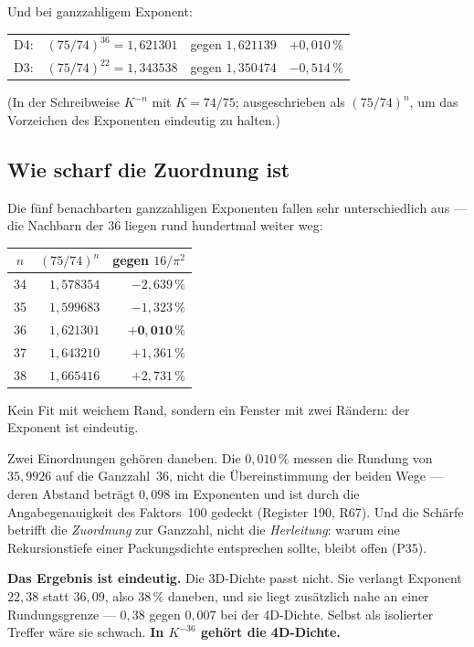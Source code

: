 Und bei ganzzahligem Exponent:
\begin{center}
\begin{tabular}{lllr}
D4: & $(75/74)^{36} = 1{,}621301$ & gegen $1{,}621139$ & $+0{,}010\,\%$ \\
D3: & $(75/74)^{22} = 1{,}343538$ & gegen $1{,}350474$ & $-0{,}514\,\%$ \\
\end{tabular}
\end{center}
(In der Schreibweise $K^{-n}$ mit $K = 74/75$; ausgeschrieben als
$(75/74)^n$, um das Vorzeichen des Exponenten eindeutig zu halten.)

\subsection*{Wie scharf die Zuordnung ist}

Die fünf benachbarten ganzzahligen Exponenten fallen sehr
unterschiedlich aus --- die Nachbarn der 36 liegen rund hundertmal
weiter weg:
\begin{center}
\begin{tabular}{crr}
\toprule
$n$ & $(75/74)^n$ & gegen $16/\pi^2$ \\
\midrule
34 & $1{,}578354$ & $-2{,}639\,\%$ \\
35 & $1{,}599683$ & $-1{,}323\,\%$ \\
36 & $1{,}621301$ & $\mathbf{+0{,}010\,\%}$ \\
37 & $1{,}643210$ & $+1{,}361\,\%$ \\
38 & $1{,}665416$ & $+2{,}731\,\%$ \\
\bottomrule
\end{tabular}
\end{center}
Kein Fit mit weichem Rand, sondern ein Fenster mit zwei Rändern: der
Exponent ist eindeutig.

Zwei Einordnungen gehören daneben. Die $0{,}010\,\%$ messen die
Rundung von $35{,}9926$ auf die Ganzzahl~36, nicht die Übereinstimmung
der beiden Wege --- deren Abstand beträgt $0{,}098$ im Exponenten und
ist durch die Angabegenauigkeit des Faktors~100 gedeckt (Register 190,
R67). Und die Schärfe betrifft die \emph{Zuordnung} zur Ganzzahl,
nicht die \emph{Herleitung}: warum eine Rekursionstiefe einer
Packungsdichte entsprechen sollte, bleibt offen (P35).

\textbf{Das Ergebnis ist eindeutig.} Die 3D-Dichte passt nicht. Sie
verlangt Exponent $22{,}38$ statt $36{,}09$, also $38\,\%$ daneben, und
sie liegt zusätzlich nahe an einer Rundungsgrenze --- $0{,}38$ gegen
$0{,}007$ bei der 4D-Dichte. Selbst als isolierter Treffer wäre sie
schwach. \textbf{In $K^{-36}$ gehört die 4D-Dichte.}

